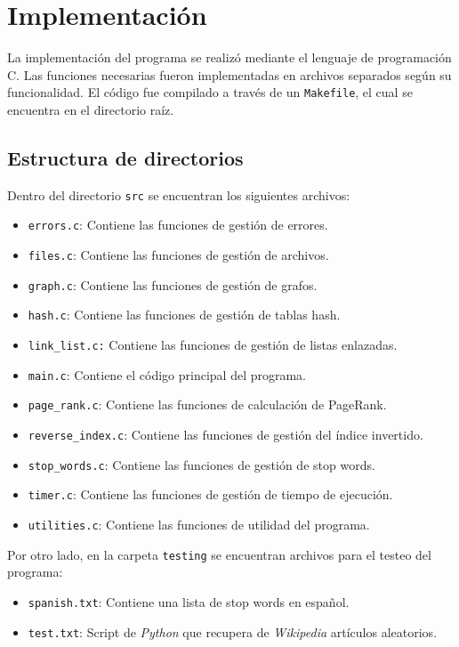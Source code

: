 \section{Implementación}
\rhostart{}

La implementación del programa se realizó mediante el lenguaje de programación C. Las funciones necesarias fueron implementadas en archivos separados según su funcionalidad. El código fue compilado a través de un \texttt{Makefile}, el cual se encuentra en el directorio raíz.

\subsection{Estructura de directorios}
Dentro del directorio \texttt{src} se encuentran los siguientes archivos:

\begin{itemize}
    \item \texttt{errors.c}: Contiene las funciones de gestión de errores.
    \item \texttt{files.c}: Contiene las funciones de gestión de archivos.
    \item \texttt{graph.c}: Contiene las funciones de gestión de grafos.
    \item \texttt{hash.c}: Contiene las funciones de gestión de tablas hash.
    \item \texttt{link\_list.c:} Contiene las funciones de gestión de listas enlazadas.
    \item \texttt{main.c}: Contiene el código principal del programa.
    \item \texttt{page\_rank.c}: Contiene las funciones de calculación de PageRank.
    \item \texttt{reverse\_index.c}: Contiene las funciones de gestión del índice invertido.
    \item \texttt{stop\_words.c}: Contiene las funciones de gestión de stop words.
    \item \texttt{timer.c}: Contiene las funciones de gestión de tiempo de ejecución.
    \item \texttt{utilities.c}: Contiene las funciones de utilidad del programa.
\end{itemize}

Por otro lado, en la carpeta \texttt{testing} se encuentran archivos para el testeo del programa:
\begin{itemize}
    \item \texttt{spanish.txt}: Contiene una lista de stop words en español.
    \item \texttt{test.txt}: Script de \textit{Python} que recupera de \textit{Wikipedia} artículos aleatorios.
\end{itemize}


